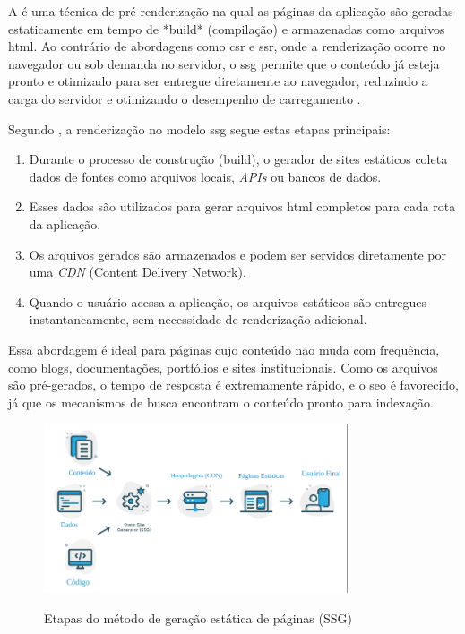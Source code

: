 A \textbf{} é uma técnica de pré-renderização na qual as páginas da aplicação são geradas estaticamente em tempo de *build* (compilação) e armazenadas como arquivos \acrshort{html}. Ao contrário de abordagens como \acrshort{csr} e \acrshort{ssr}, onde a renderização ocorre no navegador ou sob demanda no servidor, o \acrshort{ssg} permite que o conteúdo já esteja pronto e otimizado para ser entregue diretamente ao navegador, reduzindo a carga do servidor e otimizando o desempenho de carregamento \cite{pahan2021}.

Segundo , a renderização no modelo \acrshort{ssg} segue estas etapas principais:

\begin{enumerate}
    \item Durante o processo de construção (build), o gerador de sites estáticos coleta dados de fontes como arquivos locais, \emph{APIs} ou bancos de dados.
    \item Esses dados são utilizados para gerar arquivos \acrshort{html} completos para cada rota da aplicação.
    \item Os arquivos gerados são armazenados e podem ser servidos diretamente por uma \emph{CDN} (Content Delivery Network).
    \item Quando o usuário acessa a aplicação, os arquivos estáticos são entregues instantaneamente, sem necessidade de renderização adicional.
\end{enumerate}

Essa abordagem é ideal para páginas cujo conteúdo não muda com frequência, como blogs, documentações, portfólios e sites institucionais. Como os arquivos são pré-gerados, o tempo de resposta é extremamente rápido, e o \acrshort{seo} é favorecido, já que os mecanismos de busca encontram o conteúdo pronto para indexação.

\begin{figure}[H]
  \centering
  \caption{Etapas do método de geração estática de páginas (SSG)}
  \includegraphics[width=0.8\textwidth]{media/static_site_generation.png}
  \label{fig:ssg}
\end{figure}

